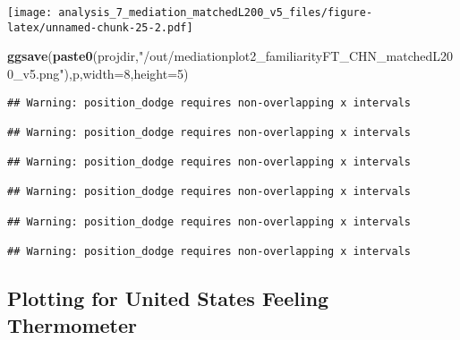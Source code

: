 \documentclass[
]{article}
\newenvironment{Shaded}{\begin{snugshade}}{\end{snugshade}}
\newcommand{\DataTypeTok}[1]{\textcolor[rgb]{0.13,0.29,0.53}{#1}}
\newcommand{\DecValTok}[1]{\textcolor[rgb]{0.00,0.00,0.81}{#1}}
\newcommand{\KeywordTok}[1]{\textcolor[rgb]{0.13,0.29,0.53}{\textbf{#1}}}
\newcommand{\NormalTok}[1]{#1}
\newcommand{\StringTok}[1]{\textcolor[rgb]{0.31,0.60,0.02}{#1}}
\begin{document}
\texttt{[image: analysis\_7\_mediation\_matchedL200\_v5\_files/figure-latex/unnamed-chunk-25-2.pdf]}

\begin{Shaded}
\begin{Highlighting}[]
\KeywordTok{ggsave}\NormalTok{(}\KeywordTok{paste0}\NormalTok{(projdir,}\StringTok{"/out/mediationplot2_familiarityFT_CHN_matchedL200_v5.png"}\NormalTok{),p,}\DataTypeTok{width=}\DecValTok{8}\NormalTok{,}\DataTypeTok{height=}\DecValTok{5}\NormalTok{)}
\end{Highlighting}
\end{Shaded}

\begin{verbatim}
## Warning: position_dodge requires non-overlapping x intervals

## Warning: position_dodge requires non-overlapping x intervals

## Warning: position_dodge requires non-overlapping x intervals

## Warning: position_dodge requires non-overlapping x intervals

## Warning: position_dodge requires non-overlapping x intervals

## Warning: position_dodge requires non-overlapping x intervals
\end{verbatim}

\hypertarget{plotting-for-united-states-feeling-thermometer}{%
\subsection{Plotting for United States Feeling
Thermometer}\label{plotting-for-united-states-feeling-thermometer}}
\end{document}
